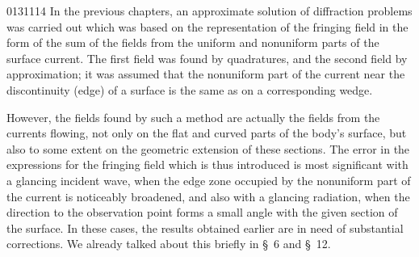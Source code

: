 \begin{scanpage}{0131}{114}
In the previous chapters, an approximate solution of diffraction problems was carried out which was based on the representation of the fringing field in the form of the sum of the fields from the uniform and nonuniform parts of the surface current. The first field was found by quadratures, and the second field by approximation; it was assumed that the nonuniform part of the current near the discontinuity (edge) of a surface is the same as on a corresponding wedge.

However, the fields found by such a method are actually the fields from the currents flowing, not only on the flat and curved parts of the body's surface, but also to some extent on the geometric extension of these sections. The error in the expressions for the fringing field which is thus introduced is most significant with a glancing incident wave, when the edge zone occupied by the nonuniform part of the current is noticeably broadened, and also with a glancing radiation, when the direction to the observation point forms a small angle with the given section of the surface. In these cases, the results obtained earlier are in need of substantial corrections. We already talked about this briefly in \S\ 6 and \S\ 12.
\end{scanpage}
